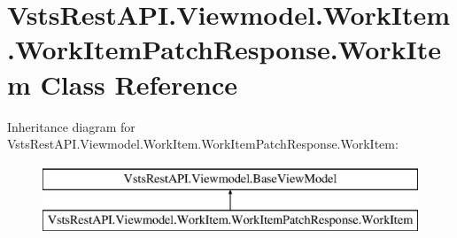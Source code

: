 \hypertarget{class_vsts_rest_a_p_i_1_1_viewmodel_1_1_work_item_1_1_work_item_patch_response_1_1_work_item}{}\section{Vsts\+Rest\+A\+P\+I.\+Viewmodel.\+Work\+Item.\+Work\+Item\+Patch\+Response.\+Work\+Item Class Reference}
\label{class_vsts_rest_a_p_i_1_1_viewmodel_1_1_work_item_1_1_work_item_patch_response_1_1_work_item}
Inheritance diagram for Vsts\+Rest\+A\+P\+I.\+Viewmodel.\+Work\+Item.\+Work\+Item\+Patch\+Response.\+Work\+Item\+:\begin{figure}[H]
\begin{center}
\leavevmode
\includegraphics[height=2.000000cm]{class_vsts_rest_a_p_i_1_1_viewmodel_1_1_work_item_1_1_work_item_patch_response_1_1_work_item}
\end{center}
\end{figure}

